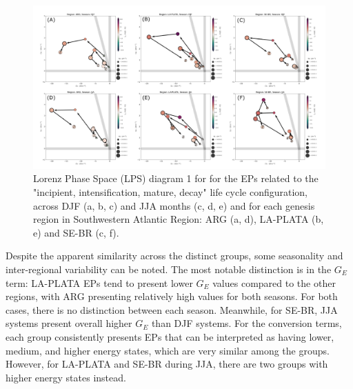 \begin{figure}[!htbp]
\centering
\includegraphics[width=\textwidth]{figs_6/lps_mixed_clusters_IcItDM_seasons_regions.pdf}
\caption[LPS 1 - Clusters - Seasonality and Spatial Variability]{Lorenz Phase Space (LPS) diagram 1 for for the EPs related to the "incipient, intensification, mature, decay" life cycle configuration, across DJF (a, b, c) and JJA months (c, d, e) and for each genesis region in Southwestern Atlantic Region: ARG (a, d), LA-PLATA (b, e) and SE-BR (c, f).}
\label{fig:lps_mixed_clusters_IcItDM_seasons_regions}
\end{figure}

Despite the apparent similarity across the distinct groups, some seasonality and inter-regional variability can be noted. The most notable distinction is in the $G_E$ term: LA-PLATA EPs tend to present lower $G_E$ values compared to the other regions, with ARG presenting relatively high values for both seasons. For both cases, there is no distinction between each season. Meanwhile, for SE-BR, JJA systems present overall higher $G_E$ than DJF systems. For the conversion terms, each group consistently presents EPs that can be interpreted as having lower, medium, and higher energy states, which are very similar among the groups. However, for LA-PLATA and SE-BR during JJA, there are two groups with higher energy states instead.


